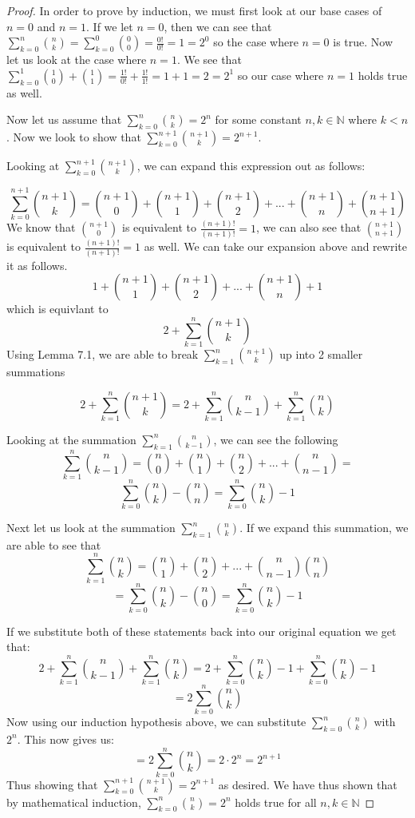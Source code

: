 \begin{proof}
In order to prove by induction, we must first look at our base cases of $n = 0$ and $n = 1$.
If we let $n = 0$, then we can see that $\sum_{k=0}^{n} {n \choose k} = \sum_{k=0}^{0} {0 \choose 0} =\frac{0!}{0!} = 1 = 2^0$ so the case where $n = 0$ is true.
Now let us look at the case where $n = 1$. We see that $\sum_{k=0}^{1} {1 \choose 0}  + {1 \choose 1} = \frac{1!}{0!} + \frac{1!}{1!} = 1 + 1 = 2 = 2^1$ so our case where $n = 1$ holds true as well.

Now let us assume that $\sum_{k=0}^{n} {n \choose k}= 2^n$ for some constant $n,k \in \mathbb{N}$ where $k < n$. Now we look to show that $\sum_{k=0}^{n + 1} {n + 1 \choose k}= 2^{n+1}$.

Looking at $\sum_{k=0}^{n + 1} {n + 1 \choose k}$, we can expand this expression out as follows:

$$ \sum_{k=0}^{n + 1} {n + 1 \choose k} = {n + 1 \choose 0} + {n + 1 \choose 1} + {n + 1 \choose 2} + ... + {n + 1 \choose n} + {n + 1 \choose n + 1}$$
We know that ${n + 1 \choose 0}$ is equivalent to $\frac{(n + 1)!}{(n + 1)!} = 1$, we can also see that ${n + 1 \choose n + 1}$ is equivalent to $\frac{(n + 1)!}{(n + 1)!} = 1$ as well. We can take our expansion above and rewrite it as follows.
$$ 1 + {n + 1 \choose 1} + {n + 1 \choose 2} + ... + {n + 1 \choose n} + 1$$
which is equivlant to 
$$ 2 + \sum_{k=1}^{n} {n + 1 \choose k} $$
Using Lemma 7.1, we are able to break $\sum_{k=1}^{n} {n + 1 \choose k}$ up into 2 smaller summations

$$ 2 + \sum_{k=1}^{n} {n + 1 \choose k}  = 2 + \sum_{k=1}^{n} {n \choose k - 1} + \sum_{k=1}^{n} {n \choose k} $$

Looking at the summation $\sum_{k=1}^{n} {n \choose k - 1}$, we can see the following $$\sum_{k=1}^{n} {n \choose k - 1} = {n  \choose 0} + {n  \choose 1} + {n \choose 2} + ... + {n \choose n - 1} = $$ $$\sum_{k=0}^{n} {n \choose k} - {n \choose n} = \sum_{k=0}^{n} {n \choose k} - 1$$

Next let us look at the summation $\sum_{k=1}^{n} {n \choose k}$. If we expand this summation, we are able to see that $$\sum_{k=1}^{n} {n \choose k} =  {n  \choose 1} + {n \choose 2} + ... + {n \choose n - 1} {n  \choose n}$$
 $$= \sum_{k=0}^{n} {n \choose k} - {n \choose 0} = \sum_{k=0}^{n} {n \choose k} - 1$$
 
 If we substitute both of these statements back into our original equation we get that:
 $$ 2 + \sum_{k=1}^{n} {n \choose k - 1} + \sum_{k=1}^{n} {n \choose k} =  2 + \sum_{k=0}^{n} {n \choose k} - 1 +  \sum_{k=0}^{n} {n \choose k} - 1$$
 $$= 2 \sum_{k=0}^{n} {n \choose k}$$
 Now using our induction hypothesis above, we can substitute $\sum_{k=0}^{n} {n \choose k}$ with $2^n$. This now gives us:
  $$= 2 \sum_{k=0}^{n} {n \choose k} = 2\cdot2^n = 2 ^{n+1}$$ Thus showing that $\sum_{k=0}^{n + 1} {n + 1 \choose k}= 2^{n+1}$ as desired. We have thus shown that by mathematical induction, $\sum_{k=0}^{n} {n \choose k}= 2^n$ holds true for all $n,k\in \mathbb{N}$
  
\end{proof}